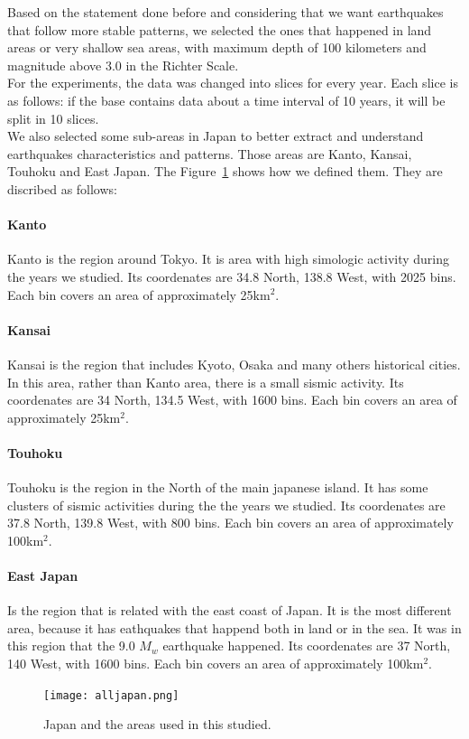 Based on the statement done before and considering that we want earthquakes that follow more stable patterns, we selected the ones that happened in land areas or very shallow sea areas, with maximum depth of 100 kilometers and magnitude above 3.0 in the Richter Scale.\\

For the experiments, the data was changed into slices for every year. Each slice is as follows: if the base contains data about a time interval of 10 years, it will be split in 10 slices.\\

We also selected some sub-areas in Japan to better extract and understand earthquakes characteristics and patterns. Those areas are Kanto, Kansai, Touhoku and East Japan. The Figure~\ref{alljapan} shows how we defined them. They are discribed as follows:

\paragraph{Kanto} Kanto is the region around Tokyo. It is area with high simologic activity during the years we studied. Its coordenates are 34.8 North, 138.8 West, with  2025 bins. Each bin covers an area of approximately 25km$^2$.\\

\paragraph{Kansai} Kansai is the region that includes Kyoto, Osaka and many others historical cities. In this area, rather than Kanto area, there is a small sismic activity. Its coordenates are 34 North, 134.5 West, with 1600 bins. Each bin covers an area of approximately 25km$^2$.\\

\paragraph{Touhoku} Touhoku is the region in the North of the main japanese island. It has some clusters of sismic activities during the the years we studied. Its coordenates are 37.8 North, 139.8 West, with  800 bins. Each bin covers an area of approximately 100km$^2$. \\

\paragraph{East Japan} Is the region that is related with the east coast of Japan. It is the most different area, because it has eathquakes that happend both in land or in the sea. It was in this region that the 9.0 $M_w$ earthquake happened. Its coordenates are 37 North, 140 West, with 1600 bins. Each bin covers an area of approximately 100km$^2$. \\

\begin{figure}[!htb]
\centering
\texttt{[image: alljapan.png]}
\caption{Japan and the areas used in this studied.}
\label{alljapan}
\end{figure}

